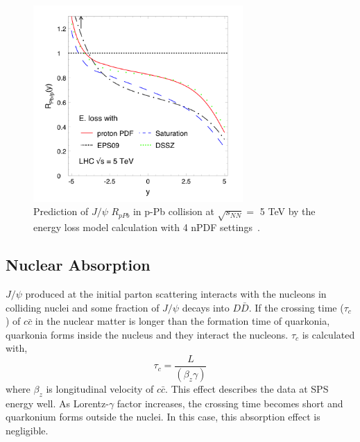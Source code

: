 \begin{figure}[!h]
    \begin{center}
      \includegraphics[width=8cm]{chap2/figure/eloss/eloss_lhc.png}
    \end{center}
  \caption{
    Prediction of $J/\psi$ $R_{pPb}$ in p-Pb collision at $\sqrt{s_{NN}}=$ 5 TeV by the energy loss model calculation with 4 nPDF settings~\cite{bib_paeloss}.
  }
  \label{fig_2_paeloss}
\end{figure}


\subsection{Nuclear Absorption}
$J/\psi$ produced at the initial parton scattering interacts with the nucleons in colliding nuclei and some fraction of $J/\psi$ decays into $D\bar{D}$. 
If the crossing time ($\tau_{c}$) of $c\bar{c}$ in the nuclear matter is longer than the formation time of quarkonia, quarkonia forms inside the nucleus and they interact the nucleons.
$\tau_{c}$ is calculated with, 
\begin{equation}
  \tau_{c} = \frac{L}{(\beta_{z}\gamma )}
\end{equation}
where  $\beta_{z}$ is longitudinal velocity of $c\bar{c}$. 
This effect describes the data at SPS energy well.
As Lorentz-$\gamma$ factor increases, the crossing time becomes short and quarkonium forms outside the nuclei. 
In this case, this absorption effect is negligible. 



